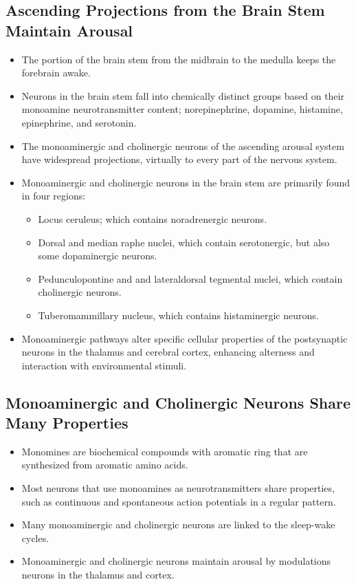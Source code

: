 \documentclass[12pt,a4paper]{article}
\begin{document}
\subsection{Ascending Projections from the Brain Stem Maintain Arousal}
\begin{itemize}
    \item The portion of the brain stem from the midbrain to the medulla keeps the forebrain awake.
    \item Neurons in the brain stem fall into chemically distinct groups based on their monoamine neurotransmitter content; norepinephrine, dopamine, histamine, epinephrine, and serotonin.
    \item The monoaminergic and cholinergic neurons of the ascending arousal system have widespread projections, virtually to every part of the nervous system.
    \item Monoaminergic and cholinergic neurons in the brain stem are primarily found in four regions:
        \begin{itemize}
            \item Locus ceruleus; which contains noradrenergic neurons.
            \item Dorsal and median raphe nuclei, which contain serotonergic, but also some dopaminergic neurons.
            \item Pedunculopontine and and lateraldorsal tegmental nuclei, which contain cholinergic neurons.
            \item Tuberomammillary nucleus, which contains histaminergic neurons. 
        \end{itemize}
    \item Monoaminergic pathways alter specific cellular properties of the postsynaptic neurons in the thalamus and cerebral cortex, enhancing alterness and interaction with environmental stimuli.
\end{itemize}

\subsection{Monoaminergic and Cholinergic Neurons Share Many Properties}
\begin{itemize}
    \item Monomines are biochemical compounds with aromatic ring that are synthesized from aromatic amino acids.
    \item Most neurons that use monoamines as neurotransmitters share properties, such as continuous and spontaneous action potentials in a regular pattern.
    \item Many monoaminergic and cholinergic neurons are linked to the sleep-wake cycles.
    \item Monoaminergic and cholinergic neurons maintain arousal by modulations neurons in the thalamus and cortex.
\end{itemize}
\end{document}

